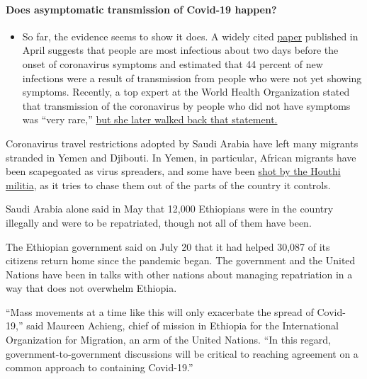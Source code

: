 \begin{itemize}
{  \paragraph{Does asymptomatic transmission of Covid-19
  happen?}\label{does-asymptomatic-transmission-of-covid-19-happen}}

  \begin{itemize}
  \tightlist
  \item
    So far, the evidence seems to show it does. A widely cited
    \href{https://www.nature.com/articles/s41591-020-0869-5}{paper}
    published in April suggests that people are most infectious about
    two days before the onset of coronavirus symptoms and estimated that
    44 percent of new infections were a result of transmission from
    people who were not yet showing symptoms. Recently, a top expert at
    the World Health Organization stated that transmission of the
    coronavirus by people who did not have symptoms was ``very rare,''
    \href{https://www.nytimes3xbfgragh.onion/2020/06/09/world/coronavirus-updates.html?action=click\&pgtype=Article\&state=default\&region=MAIN_CONTENT_3\&context=storylines_faq\#link-1f302e21}{but
    she later walked back that statement.}
  \end{itemize}
\end{itemize}

Coronavirus travel restrictions adopted by Saudi Arabia have left many
migrants stranded in Yemen and Djibouti. In Yemen, in particular,
African migrants have been scapegoated as virus spreaders, and some have
been
\href{https://www.nytimes3xbfgragh.onion/2020/06/28/world/middleeast/coronavirus-yemen-african-migrants.html}{shot
by the Houthi militia}, as it tries to chase them out of the parts of
the country it controls.

Saudi Arabia alone said in May that 12,000 Ethiopians were in the
country illegally and were to be repatriated, though not all of them
have been.

The Ethiopian government said on July 20 that it had helped 30,087 of
its citizens return home since the pandemic began. The government and
the United Nations have been in talks with other nations about managing
repatriation in a way that does not overwhelm Ethiopia.

``Mass movements at a time like this will only exacerbate the spread of
Covid-19,'' said Maureen Achieng, chief of mission in Ethiopia for the
International Organization for Migration, an arm of the United Nations.
``In this regard, government-to-government discussions will be critical
to reaching agreement on a common approach to containing Covid-19.''

